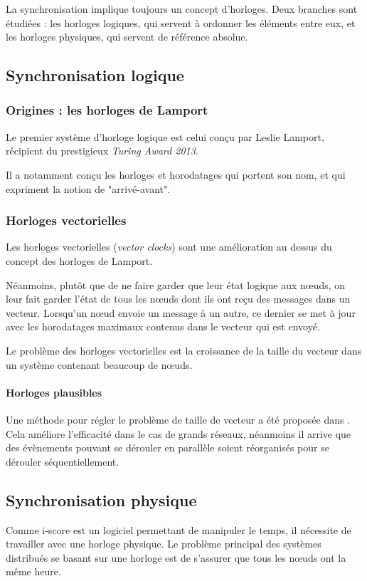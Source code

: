 La synchronisation implique toujours un concept d'horloges. Deux branches sont étudiées : les horloges logiques, qui servent à ordonner les éléments entre eux, et les horloges physiques, qui servent de référence absolue.

\subsection{Synchronisation logique}
\subsubsection{Origines : les horloges de Lamport}
Le premier système d'horloge logique est celui conçu par Leslie Lamport, récipient du prestigieux \textit{Turing Award 2013}.

Il a notamment conçu les horloges et horodatages qui portent son nom, et qui expriment la notion de "arrivé-avant".
\subsubsection{Horloges vectorielles}
Les horloges vectorielles (\textit{vector clocks}) sont une amélioration au dessus du concept des horloges de Lamport.

Néanmoins, plutôt que de ne faire garder que leur état logique aux nœuds, on leur fait garder l'état de tous les nœuds dont ils ont reçu des messages dans un vecteur. Lorsqu'un nœud envoie un message à un autre, ce dernier se met à jour avec les horodatages maximaux contenus dans le vecteur qui est envoyé.

Le problème des horloges vectorielles est la croissance de la taille du vecteur dans un système contenant beaucoup de nœuds.

\paragraph{Horloges plausibles}
Une méthode pour régler le problème de taille de vecteur a été proposée dans \cite{torres1999plausible}. Cela améliore l'efficacité dans le cas de grands réseaux, néanmoins il arrive que des évènements pouvant se dérouler en parallèle soient réorganisés pour se dérouler séquentiellement.

\subsection{Synchronisation physique}
Comme i-score est un logiciel permettant de manipuler le temps, il nécessite de travailler avec une horloge physique. Le problème principal des systèmes distribués se basant sur une horloge est de s'assurer que tous les nœuds ont la même heure.


